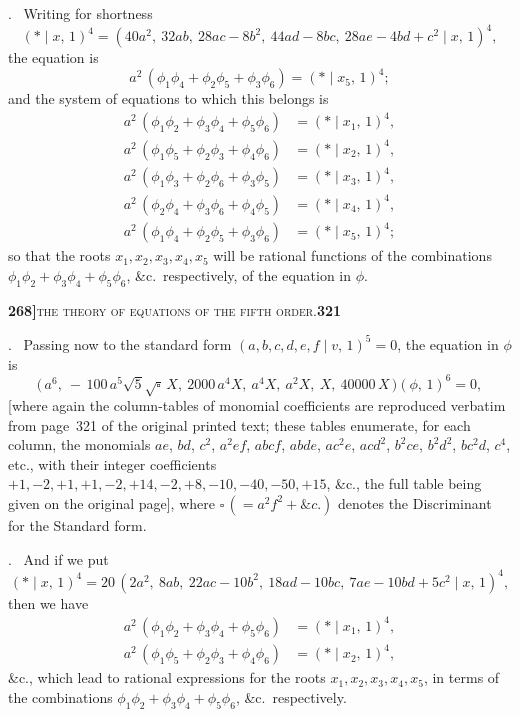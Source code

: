 \documentclass[11pt]{article}
\newcommand{\Cdel}{\mid}
\begin{document}
\medskip

. \ Writing for shortness
\[
   (*\Cdel x,\,1)^4 = (40 a^2,\ 32 a b,\ 28 a c - 8 b^2,\ 44 a d - 8 b c,\ 28 a e - 4 b d + c^2\Cdel x,\,1)^4,
\]
the equation is
\[
   a^2\,(\phi_1\phi_4 + \phi_2\phi_5 + \phi_3\phi_6) = (*\Cdel x_5,\,1)^4;
\]
and the system of equations to which this belongs is
\[
\begin{aligned}
   a^2\,(\phi_1\phi_2 + \phi_3\phi_4 + \phi_5\phi_6) &= (*\Cdel x_1,\,1)^4,\\
   a^2\,(\phi_1\phi_5 + \phi_2\phi_3 + \phi_4\phi_6) &= (*\Cdel x_2,\,1)^4,\\
   a^2\,(\phi_1\phi_3 + \phi_2\phi_6 + \phi_3\phi_5) &= (*\Cdel x_3,\,1)^4,\\
   a^2\,(\phi_2\phi_4 + \phi_3\phi_6 + \phi_4\phi_5) &= (*\Cdel x_4,\,1)^4,\\
   a^2\,(\phi_1\phi_4 + \phi_2\phi_5 + \phi_3\phi_6) &= (*\Cdel x_5,\,1)^4;
\end{aligned}
\]
so that the roots $x_1, x_2, x_3, x_4, x_5$ will be rational functions of the combinations $\phi_1\phi_2 + \phi_3\phi_4 + \phi_5\phi_6$, \&c.\ respectively, of the equation in $\phi$.

\newpage
\setcounter{page}{321}

\noindent\textbf{268]}\hfill\textsc{the theory of equations of the fifth order.}\hfill\textbf{321}

\medskip

. \ Passing now to the standard form $(a, b, c, d, e, f\Cdel v,\,1)^5 = 0$, the equation in $\phi$ is
\[
\bigl(\,a^6,\ -\,100\,a^5\sqrt{5}\sqrt{\square}\,X,\ 2000\,a^4 X,\ a^4 X,\ a^2 X,\ X,\ 40000\,X\,\bigr)(\phi,\,1)^6 = 0,
\]
[where again the column-tables of monomial coefficients are reproduced verbatim from page~321 of the original printed text; these tables enumerate, for each column, the monomials $a e$, $b d$, $c^2$, $a^2 e f$, $a b c f$, $a b d e$, $a c^2 e$, $a c d^2$, $b^2 c e$, $b^2 d^2$, $b c^2 d$, $c^4$, etc., with their integer coefficients $+1, -2, +1, +1, -2, +14, -2, +8, -10, -40, -50, +15$, \&c., the full table being given on the original page],
where $\square\,(= a^2 f^2 + \&c.)$ denotes the Discriminant for the Standard form.

\medskip

. \ And if we put
\[
   (*\Cdel x,\,1)^4 = 20\,(2 a^2,\ 8 a b,\ 22 a c - 10 b^2,\ 18 a d - 10 b c,\ 7 a e - 10 b d + 5 c^2\Cdel x,\,1)^4,
\]
then we have
\[
\begin{aligned}
   a^2\,(\phi_1\phi_2 + \phi_3\phi_4 + \phi_5\phi_6) &= (*\Cdel x_1,\,1)^4,\\
   a^2\,(\phi_1\phi_5 + \phi_2\phi_3 + \phi_4\phi_6) &= (*\Cdel x_2,\,1)^4,
\end{aligned}
\]
\&c., which lead to rational expressions for the roots $x_1, x_2, x_3, x_4, x_5$, in terms of the combinations $\phi_1\phi_2 + \phi_3\phi_4 + \phi_5\phi_6$, \&c.\ respectively.
\end{document}
